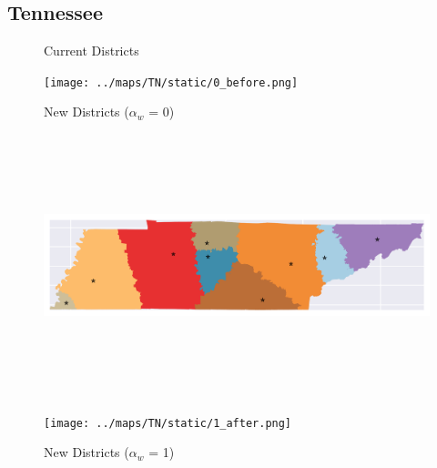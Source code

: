 \subsection{Tennessee}
\begin{figure}[htb!] \centering
\caption{ Current Districts }
\texttt{[image: ../maps/TN/static/0\_before.png]}
\caption{ New Districts ($\alpha_w$ = 0) }
\includegraphics[width=5in,height=3in,keepaspectratio]{../maps/TN/static/0_after.png}
\caption{ New Districts ($\alpha_w$ = 1) }
\texttt{[image: ../maps/TN/static/1\_after.png]}
\end{figure}

\clearpage
\newpage

